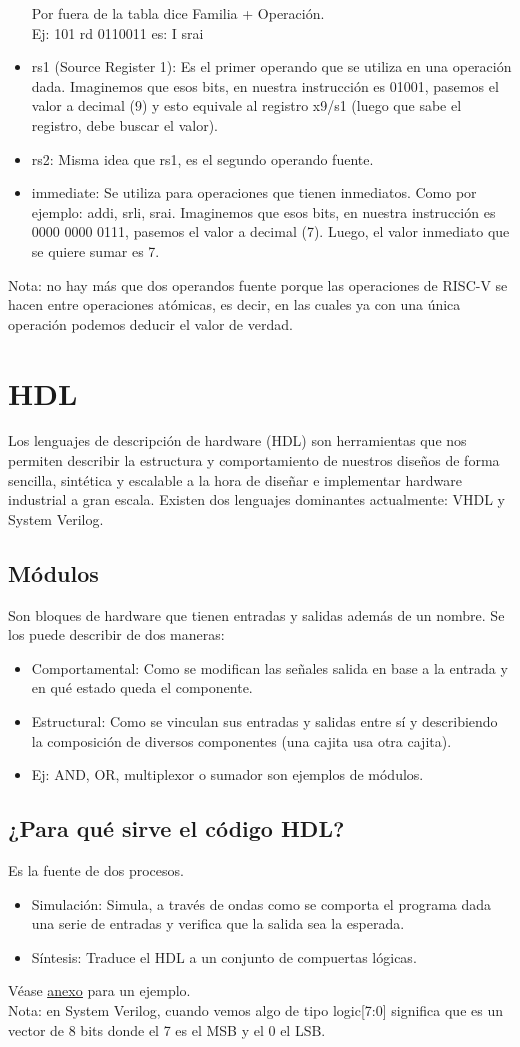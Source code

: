\documentclass[10pt,a4paper]{article}
\begin{document}
\begin{itemize}
    Por fuera de la tabla dice Familia + Operación. \\
    Ej: 101 rd 0110011 es: I srai
    \item rs1 (Source Register 1): Es el primer operando que se utiliza en una operación dada. Imaginemos que esos bits, en nuestra instrucción es 01001, pasemos el valor a decimal (9) y esto equivale al registro x9/s1 (luego que sabe el registro, debe buscar el valor).
    \item rs2: Misma idea que rs1, es el segundo operando fuente.
    \item immediate: Se utiliza para operaciones que tienen inmediatos. Como por ejemplo: addi, srli, srai. Imaginemos que esos bits, en nuestra instrucción es 0000 0000 0111, pasemos el valor a decimal (7). Luego, el valor inmediato que se quiere sumar es 7.
\end{itemize}
Nota: no hay más que dos operandos fuente porque las operaciones de RISC-V se hacen entre operaciones atómicas, es decir, en las cuales ya con una única operación podemos deducir el valor de verdad.
\section*{HDL}
Los lenguajes de descripción de hardware (HDL) son herramientas que nos permiten describir la estructura y comportamiento de nuestros diseños de forma sencilla, sintética y escalable a la hora de diseñar e implementar hardware industrial a gran escala.
Existen dos lenguajes dominantes actualmente: VHDL y System Verilog. 
\subsection*{Módulos}
Son bloques de hardware que tienen entradas y salidas además de un nombre. Se los puede describir de dos maneras:
\begin{itemize}
    \item Comportamental: Como se modifican las señales salida en base a la entrada y en qué estado queda el componente.
    \item Estructural: Como se vinculan sus entradas y salidas entre sí y describiendo la composición de diversos componentes (una cajita usa otra cajita).
    \item Ej: AND, OR, multiplexor o sumador son ejemplos de módulos.
\end{itemize}
\subsection*{¿Para qué sirve el código HDL?}
Es la fuente de dos procesos.
\begin{itemize}
    \item Simulación: Simula, a través de ondas como se comporta el programa dada una serie de entradas y verifica que la salida sea la esperada.
    \item Síntesis: Traduce el HDL a un conjunto de compuertas lógicas.
\end{itemize}
Véase \hyperref[subsec:SVL_S_S]{\underline{anexo}} para un ejemplo. \\ 
Nota: en System Verilog, cuando vemos algo de tipo logic[7:0] significa que es un vector de 8 bits donde el 7 es el MSB y el 0 el LSB.
\end{document}
